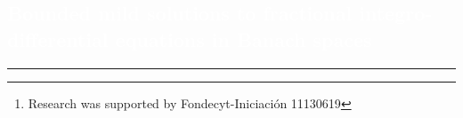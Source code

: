 \author{%
\\
    Rodrigo Ponce \thanks{Research was supported by Fondecyt-Iniciaci\'on 11130619}\\
    Universidad de Talca \\
        \texttt{\footnotesize rponce@inst-mat.utalca.cl}\vspace{40pt} \\
         }
\pagecolor{white}\afterpage{\nopagecolor}
\pagestyle{eimat}
\begin{titlepage}
\BgThispage
{}
\vspace*{-1.1cm}
\noindent
\def\titulo#1{\section{#1}}

\section{\large\bf\textcolor{white}{Bounded mild solutions to fractional integro-differential equations in Banach spaces}}

\vspace*{2cm}\par
\noindent

\begin{minipage}{0.5\linewidth}
\begin{minipage}{0.45\linewidth}
    \begin{flushright}
        \printauthor
    \end{flushright}
\end{minipage} \hspace{-3pt}
%
\begin{minipage}{0.02\linewidth}
   \color{ptctitle} \rule{1pt}{175pt}
\end{minipage} 
\end{minipage}
\hspace*{-4.5cm}
%
\begin{minipage}{0.85\linewidth}
\footnotesize
\begin{minipage}{0.85\linewidth}
\vspace{5pt}
    \begin{abstract} 
  

\end{abstract}
\end{minipage}
\end{minipage}
\end{titlepage}
